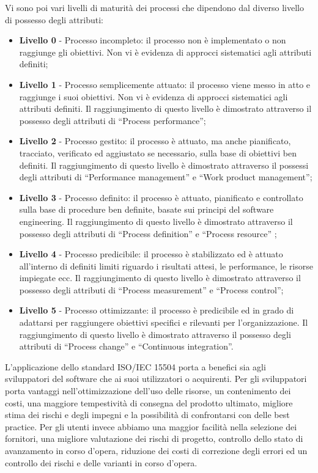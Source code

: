 Vi sono poi vari livelli di maturità dei processi che dipendono dal diverso livello di possesso degli attributi:
\begin{itemize}
\item \textbf{Livello 0} - Processo incompleto: il processo non è implementato o non raggiunge gli obiettivi. Non vi è evidenza di approcci sistematici agli attributi definiti;
\item \textbf{Livello 1} - Processo semplicemente attuato: il processo viene messo in atto e raggiunge i suoi obiettivi. Non vi è evidenza di approcci sistematici agli attributi definiti. Il raggiungimento di questo livello è dimostrato attraverso il possesso degli attributi di “Process performance”;
\item \textbf{Livello 2} - Processo gestito: il processo è attuato, ma anche pianificato, tracciato, verificato ed aggiustato se necessario, sulla base di obiettivi ben definiti. Il raggiungimento di questo livello è dimostrato attraverso il possessi degli attributi di “Performance management” e “Work product management”;
\item \textbf{Livello 3} - Processo definito: il processo è attuato, pianificato e controllato sulla base di procedure ben definite, basate sui principi del software engineering. Il raggiungimento di questo livello è dimostrato attraverso il possesso degli attributi di “Process definition” e “Process resource” ;
\item \textbf{Livello 4} - Processo predicibile: il processo è stabilizzato ed è attuato all’interno di definiti limiti riguardo i risultati attesi, le performance, le risorse impiegate ecc. Il raggiungimento di questo livello è dimostrato attraverso il possesso degli attributi di “Process measurement” e “Process control”;
\item \textbf{Livello 5} - Processo ottimizzante: il processo è predicibile ed in grado di adattarsi per raggiungere obiettivi specifici e rilevanti per l’organizzazione.
Il raggiungimento di questo livello è dimostrato attraverso il possesso degli attributi di “Process change” e “Continuous integration”.
\end{itemize}

L’applicazione dello standard ISO/IEC 15504 porta a benefici sia agli sviluppatori del software che ai suoi utilizzatori o acquirenti. Per gli sviluppatori porta vantaggi nell’ottimizzazione dell’uso delle risorse, un contenimento dei costi, una maggiore tempestività di consegna del prodotto ultimato, migliore stima dei rischi e degli impegni e la possibilità di confrontarsi con delle best practice. 
Per gli utenti invece abbiamo una maggior facilità nella selezione dei fornitori, una migliore valutazione dei rischi di progetto, controllo dello stato di avanzamento in corso d’opera, riduzione dei costi di correzione degli errori ed un controllo dei rischi e delle varianti in corso d’opera.

